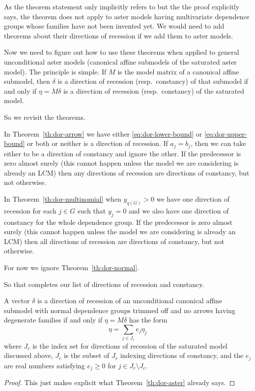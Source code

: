 As the theorem statement only implicitly refers to but the the proof
explicitly says, the theorem does not apply to aster models having
multivariate dependence groups whose families have not been invented yet.
We would need to add theorems about their directions of recession if we
add them to aster models.

Now we need to figure out how to use these theorems when applied to
general unconditional aster models (canonical affine submodels of
the saturated aster model).  The principle is simple.  If $M$ is the
model matrix of a canonical affine submodel, then $\delta$ is a direction
of recession (resp.\ constancy) of that submodel if and only
if $\eta = M \delta$ is a direction of recession (resp.\ constancy)
of the saturated model.

So we revisit the theorems.

In Theorem~\ref{th:dor-arrow} we have either
\eqref{eq:dor-lower-bound} or \eqref{eq:dor-upper-bound} or both or neither
is a direction of recession.  If $a_j = b_j$, then we can take either to
be a direction of constancy and ignore the other.
If the predecessor is zero almost surely (this cannot happen unless the
model we are considering is already an LCM) then any directions of recession
are directions of constancy, but not otherwise.

In Theorem~\ref{th:dor-multinomial} when $y_{q(G)} > 0$ we have one
direction of recession for each $j \in G$ such that $y_j = 0$ and
we also have one direction of constancy for the whole dependence group.
If the predecessor is zero almost surely (this cannot happen unless the
model we are considering is already an LCM) then all directions of recession
are directions of constancy, but not otherwise.

For now we ignore Theorem~\ref{th:dor-normal}.

So that completes our list of directions of recession and constancy.

\begin{theorem} \label{th:dor-aster-explicit}
A vector $\delta$ is a direction of recession
of an unconditional canonical affine submodel
with normal dependence groups trimmed off and
no arrows having degenerate families
if and only if $\eta = M \delta$ has the form
\begin{equation} \label{eq:dor-aster-explicit}
   \eta = \sum_{j \in J_r} e_j \eta_j
\end{equation}
where $J_r$ is the index set for directions of recession
of the saturated model discussed above,
$J_c$ is the subset of $J_r$ indexing directions of constancy, and
the $e_j$ are real numbers satisfying $e_j \ge 0$
for $j \in J_r \setminus J_c$.
\end{theorem}
\begin{proof}
This just makes explicit what Theorem~\ref{th:dor-aster} already says.
\end{proof}

